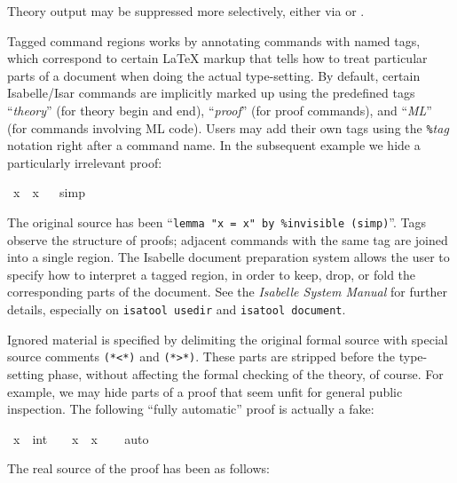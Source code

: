 \begin{isabellebody}
\begin{isamarkuptext}
  \medskip Theory output may be suppressed more selectively, either
  via  or .

  Tagged command regions works by annotating commands with named tags,
  which correspond to certain {\LaTeX} markup that tells how to treat
  particular parts of a document when doing the actual type-setting.
  By default, certain Isabelle/Isar commands are implicitly marked up
  using the predefined tags ``\emph{theory}'' (for theory begin and
  end), ``\emph{proof}'' (for proof commands), and ``\emph{ML}'' (for
  commands involving ML code).  Users may add their own tags using the
  \verb,%,\emph{tag} notation right after a command name.  In the
  subsequent example we hide a particularly irrelevant proof:%
\end{isamarkuptext}%
\isamarkuptrue%
\isamarkupfalse%
\ {\isachardoublequoteopen}x\ {\isacharequal}\ x{\isachardoublequoteclose}%
\isadeliminvisible
\ %
\endisadeliminvisible
%
\isataginvisible
{}\isamarkupfalse%
\ {\isacharparenleft}simp{\isacharparenright}%
\endisataginvisible
{\isafoldinvisible}%
%
\isadeliminvisible
%
\endisadeliminvisible
%
\begin{isamarkuptext}%
The original source has been ``\verb,lemma "x = x" by %invisible (simp),''.
  Tags observe the structure of proofs; adjacent commands with the
  same tag are joined into a single region.  The Isabelle document
  preparation system allows the user to specify how to interpret a
  tagged region, in order to keep, drop, or fold the corresponding
  parts of the document.  See the \emph{Isabelle System Manual}
  \cite{isabelle-sys} for further details, especially on
  \texttt{isatool usedir} and \texttt{isatool document}.

  Ignored material is specified by delimiting the original formal
  source with special source comments
  \verb,(,\verb,*,\verb,<,\verb,*,\verb,), and
  \verb,(,\verb,*,\verb,>,\verb,*,\verb,),.  These parts are stripped
  before the type-setting phase, without affecting the formal checking
  of the theory, of course.  For example, we may hide parts of a proof
  that seem unfit for general public inspection.  The following
  ``fully automatic'' proof is actually a fake:%
\end{isamarkuptext}%
\isamarkuptrue%
\isamarkupfalse%
\ {\isachardoublequoteopen}x\ {\isasymnoteq}\ {\isacharparenleft}{}{\isacharcolon}{\isacharcolon}int{\isacharparenright}\ {\isasymLongrightarrow}\ {}\ {\isacharless}\ x\ {\isacharasterisk}\ x{\isachardoublequoteclose}\isanewline
%
\isadelimproof
\ \ %
\endisadelimproof
%
\isatagproof
{}\isamarkupfalse%
\ {\isacharparenleft}auto{\isacharparenright}%
\endisatagproof
{\isafoldproof}%
%
\isadelimproof
%
\endisadelimproof
%
\begin{isamarkuptext}%
\noindent The real source of the proof has been as follows:


\end{isamarkuptext}
\end{isabellebody}
